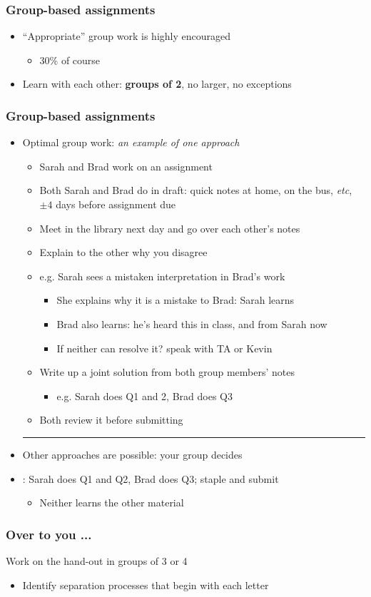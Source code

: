 \begin{frame}\frametitle{Group-based assignments}
	\begin{itemize}
		\item	``Appropriate'' group work is highly encouraged 
		\begin{itemize}
			\item	30\% of course
		\end{itemize}
		\item	Learn with each other: \textbf{groups of 2}, no larger, no exceptions
	\end{itemize}
\end{frame}

\begin{frame}\frametitle{Group-based assignments}
	\begin{itemize}
		\item	Optimal group work: \emph{an example of one approach}
			\begin{itemize}
				\item	Sarah and Brad work on an assignment
				\item	Both Sarah and Brad do {} in draft: quick notes at home, on the bus, \emph{etc}, $\pm 4$ days before assignment due
				\pause
				\item	Meet in the library next day and go over each other's notes
				\item	Explain to the other why you disagree
				\item	e.g. Sarah sees a mistaken interpretation in Brad's work
				\begin{itemize}
					\item	She explains why it is a mistake to Brad: Sarah learns
					\item	Brad also learns: he's heard this in class, and from Sarah now
					\item	If neither can resolve it? speak with TA or Kevin					
				\end{itemize}
				\pause
				\item	Write up a joint solution from both group members' notes
				\begin{itemize}
					\item	e.g. Sarah does Q1 and 2, Brad does Q3
				\end{itemize}
				\item	Both review it before submitting
			\end{itemize}
		\vspace{2pt}\hrule\vspace{2pt}
		\pause		
		\item	Other approaches are possible: your group decides
		\item	{\color{myOrange}{What doesn't work}:} Sarah does Q1 and Q2, Brad does Q3; staple and submit
		\begin{itemize}
			\item	Neither learns the other material
		\end{itemize}
	\end{itemize}
\end{frame}

\begin{frame}\frametitle{Over to you ...}
	Work on the hand-out in groups of 3 or 4
	\begin{itemize}
		\item	Identify separation processes that begin with each letter
	\end{itemize}
\end{frame}

